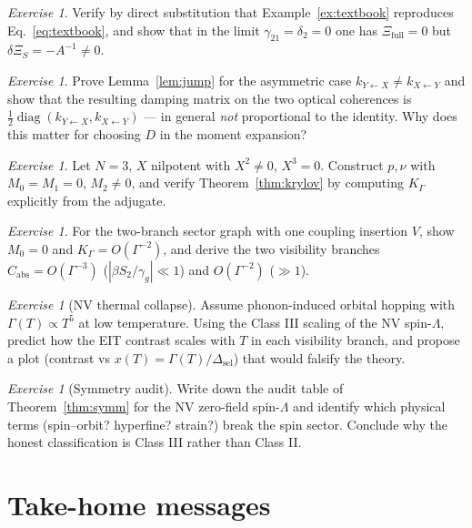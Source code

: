 \documentclass[11pt,a4paper]{article}
\theoremstyle{remark}
\newtheorem{exercise}[theorem]{Exercise}
\begin{document}
\begin{exercise}
Verify by direct substitution that Example~\ref{ex:textbook} reproduces
Eq.~\eqref{eq:textbook}, and show that in the limit $\gamma_{21}=\delta_2=0$
one has $\Xi_{\mathrm{full}}=0$ but $\delta\Xi_S=-A^{-1}\neq0$.
\end{exercise}

\begin{exercise}
Prove Lemma~\ref{lem:jump} for the asymmetric case
$k_{Y\leftarrow X}\neq k_{X\leftarrow Y}$ and show that the resulting damping
matrix on the two optical coherences is
$\tfrac12\operatorname{diag}(k_{Y\leftarrow X},k_{X\leftarrow Y})$ ---
in general \emph{not} proportional to the identity. Why does this matter for
choosing $D$ in the moment expansion?
\end{exercise}

\begin{exercise}
Let $N=3$, $X$ nilpotent with $X^2\neq0$, $X^3=0$. Construct $p,\nu$ with
$M_0=M_1=0$, $M_2\neq0$, and verify Theorem~\ref{thm:krylov} by computing
$K_\Gamma$ explicitly from the adjugate.
\end{exercise}

\begin{exercise}
For the two-branch sector graph with one coupling insertion $V$, show
$M_0=0$ and $K_\Gamma=O(\Gamma^{-2})$, and derive the two visibility branches
$C_{\mathrm{abs}}=O(\Gamma^{-3})$ ($|\beta S_2/\gamma_g|\ll1$) and
$O(\Gamma^{-2})$ ($\gg1$).
\end{exercise}

\begin{exercise}[NV thermal collapse]
Assume phonon-induced orbital hopping with $\Gamma(T)\propto T^5$ at low
temperature. Using the Class III scaling of the NV spin-$\Lambda$, predict
how the EIT contrast scales with $T$ in each visibility branch, and propose a
plot (contrast vs $x(T)=\Gamma(T)/\Delta_{\mathrm{sel}}$) that would falsify
the theory.
\end{exercise}

\begin{exercise}[Symmetry audit]
Write down the audit table of Theorem~\ref{thm:symm} for the NV zero-field
spin-$\Lambda$ and identify which physical terms (spin--orbit? hyperfine?
strain?) break the spin sector. Conclude why the honest classification is
Class III rather than Class II.
\end{exercise}

\section*{Take-home messages}
\end{document}
